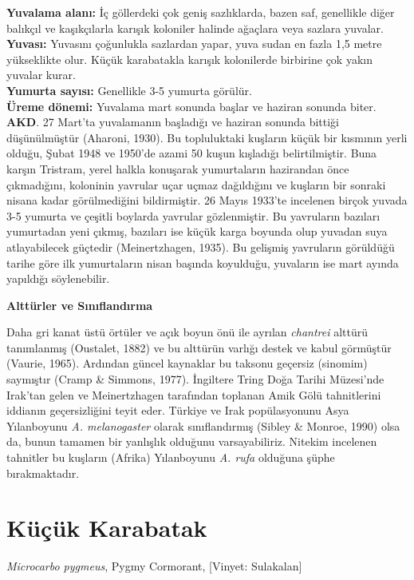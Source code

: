 \documentclass[
  a4paper,
  DIV=11,
  numbers=noendperiod]{scrreprt}
\begin{document}
\textbf{Yuvalama alanı:} İç göllerdeki çok geniş sazlıklarda, bazen saf,
genellikle diğer balıkçıl ve kaşıkçılarla karışık koloniler halinde
ağaçlara veya sazlara yuvalar.\\
\textbf{Yuvası:} Yuvasını çoğunlukla sazlardan yapar, yuva sudan en
fazla 1,5 metre yükseklikte olur. Küçük karabatakla karışık kolonilerde
birbirine çok yakın yuvalar kurar.\\
\textbf{Yumurta sayısı:} Genellikle 3-5 yumurta görülür.\\
\textbf{Üreme dönemi:} Yuvalama mart sonunda başlar ve haziran sonunda
biter. \textbf{AKD}. 27 Mart'ta yuvalamanın başladığı ve haziran sonunda
bittiği düşünülmüştür (Aharoni, 1930). Bu topluluktaki kuşların küçük
bir kısmının yerli olduğu, Şubat 1948 ve 1950'de azami 50 kuşun
kışladığı belirtilmiştir. Buna karşın Tristram, yerel halkla konuşarak
yumurtaların hazirandan önce çıkmadığını, koloninin yavrular uçar uçmaz
dağıldığını ve kuşların bir sonraki nisana kadar görülmediğini
bildirmiştir. 26 Mayıs 1933'te incelenen birçok yuvada 3-5 yumurta ve
çeşitli boylarda yavrular gözlenmiştir. Bu yavruların bazıları
yumurtadan yeni çıkmış, bazıları ise küçük karga boyunda olup yuvadan
suya atlayabilecek güçtedir (Meinertzhagen, 1935). Bu gelişmiş
yavruların görüldüğü tarihe göre ilk yumurtaların nisan başında
koyulduğu, yuvaların ise mart ayında yapıldığı söylenebilir.

\textbf{Alttürler ve Sınıflandırma}

Daha gri kanat üstü örtüler ve açık boyun önü ile ayrılan
\emph{chantrei} alttürü tanımlanmış (Oustalet, 1882) ve bu alttürün
varlığı destek ve kabul görmüştür (Vaurie, 1965). Ardından güncel
kaynaklar bu taksonu geçersiz (sinomim) saymıştır (Cramp \& Simmons,
1977). İngiltere Tring Doğa Tarihi Müzesi'nde Irak'tan gelen ve
Meinertzhagen tarafından toplanan Amik Gölü tahnitlerini iddianın
geçersizliğini teyit eder. Türkiye ve Irak popülasyonunu Asya
Yılanboyunu \emph{A. melanogaster} olarak sınıflandırmış (Sibley \&
Monroe, 1990) olsa da, bunun tamamen bir yanlışlık olduğunu
varsayabiliriz. Nitekim incelenen tahnitler bu kuşların (Afrika)
Yılanboyunu \emph{A. rufa} olduğuna şüphe bırakmaktadır.

\section{Küçük Karabatak}\label{kuxfcuxe7uxfck-karabatak}

\emph{Microcarbo pygmeus}, Pygmy Cormorant, {[}Vinyet: Sulakalan{]}
\end{document}
